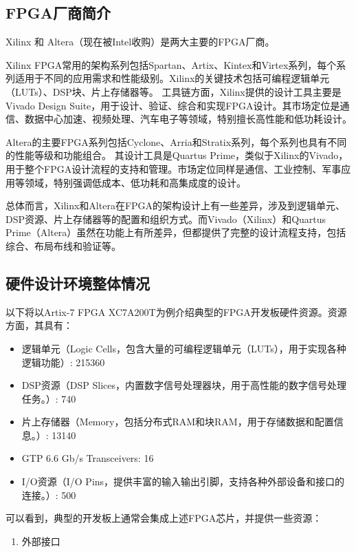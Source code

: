 \subsection{FPGA厂商简介}\label{sec:02-design-environment-003}

Xilinx 和 Altera（现在被Intel收购）是两大主要的FPGA厂商。

Xilinx FPGA常用的架构系列包括Spartan、Artix、Kintex和Virtex系列，每个系列适用于不同的应用需求和性能级别。Xilinx的关键技术包括可编程逻辑单元（LUTs）、DSP块、片上存储器等。
工具链方面，Xilinx提供的设计工具主要是Vivado Design Suite，用于设计、验证、综合和实现FPGA设计。其市场定位是通信、数据中心加速、视频处理、汽车电子等领域，特别擅长高性能和低功耗设计。

Altera的主要FPGA系列包括Cyclone、Arria和Stratix系列，每个系列也具有不同的性能等级和功能组合。
其设计工具是Quartus Prime，类似于Xilinx的Vivado，用于整个FPGA设计流程的支持和管理。市场定位同样是通信、工业控制、军事应用等领域，特别强调低成本、低功耗和高集成度的设计。

总体而言，Xilinx和Altera在FPGA的架构设计上有一些差异，涉及到逻辑单元、DSP资源、片上存储器等的配置和组织方式。而Vivado（Xilinx）和Quartus Prime（Altera）虽然在功能上有所差异，但都提供了完整的设计流程支持，包括综合、布局布线和验证等。

\subsection{硬件设计环境整体情况}\label{sec:02-design-environment-004}

以下将以Artix-7 FPGA XC7A200T为例介绍典型的FPGA开发板硬件资源。资源方面，其具有：

\begin{itemize}
\item
  逻辑单元（Logic Cells，包含大量的可编程逻辑单元（LUTs），用于实现各种逻辑功能）: 215360
\item
  DSP资源（DSP Slices，内置数字信号处理器块，用于高性能的数字信号处理任务。）: 740
\item
  片上存储器（Memory，包括分布式RAM和块RAM，用于存储数据和配置信息。）: 13140
\item
  GTP 6.6 Gb/s Transceivers: 16
\item
  I/O资源（I/O Pins，提供丰富的输入输出引脚，支持各种外部设备和接口的连接。）: 500
\end{itemize}

可以看到，典型的开发板上通常会集成上述FPGA芯片，并提供一些资源：

\begin{enumerate}
\def\labelenumi{\arabic{enumi}.}
\tightlist
\item
  外部接口
\end{enumerate}


